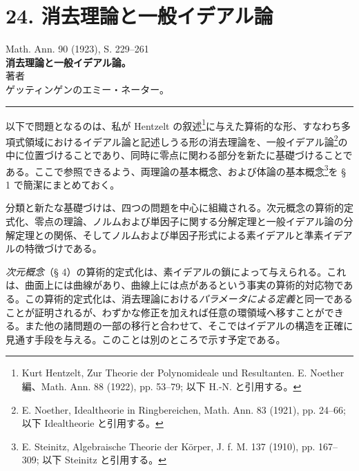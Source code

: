 \documentclass[11pt]{article}
\begin{document}
\section*{24. 消去理論と一般イデアル論}
\begin{center}
Math. Ann. 90 (1923), S. 229--261\\[0.9em]
{\Large\bfseries 消去理論と一般イデアル論。}\\[1.0em]
著者\\[0.45em]
ゲッティンゲンのエミー・ネーター。\\[0.6em]
\rule{4em}{0.4pt}
\end{center}

以下で問題となるのは、私が Hentzelt の叙述\footnote{Kurt Hentzelt, Zur Theorie der Polynomideale und Resultanten. E. Noether 編、Math. Ann. 88 (1922), pp. 53--79; 以下 H.-N. と引用する。}に与えた算術的な形、すなわち多項式領域におけるイデアル論と記述しうる形の消去理論を、一般イデアル論\footnote{E. Noether, Idealtheorie in Ringbereichen, Math. Ann. 83 (1921), pp. 24--66; 以下 Idealtheorie と引用する。}の中に位置づけることであり、同時に零点に関わる部分を新たに基礎づけることである。ここで参照できるよう、両理論の基本概念、および体論の基本概念\footnote{E. Steinitz, Algebraische Theorie der Körper, J. f. M. 137 (1910), pp. 167--309; 以下 Steinitz と引用する。}を § 1 で簡潔にまとめておく。

分類と新たな基礎づけは、四つの問題を中心に組織される。次元概念の算術的定式化、零点の理論、ノルムおよび単因子に関する分解定理と一般イデアル論の分解定理との関係、そしてノルムおよび単因子形式による素イデアルと準素イデアルの特徴づけである。

\emph{次元概念}（§ 4）の算術的定式化は、素イデアルの鎖によって与えられる。これは、曲面上には曲線があり、曲線上には点があるという事実の算術的対応物である。この算術的定式化は、消去理論における\emph{パラメータによる定義}と同一であることが証明されるが、わずかな修正を加えれば任意の環領域へ移すことができる。また他の諸問題の一部の移行と合わせて、そこではイデアルの構造を正確に見通す手段を与える。このことは別のところで示す予定である。
\end{document}
